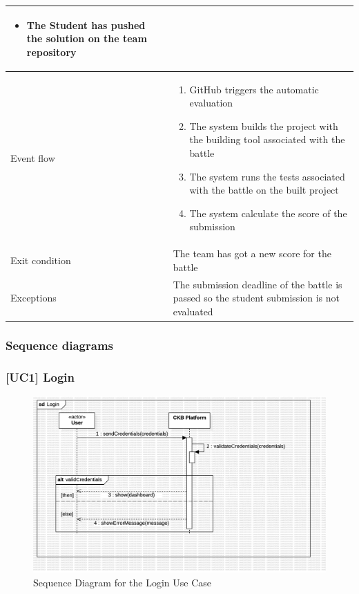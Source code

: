 \begin{enumerate}[label=UC\arabic*:]
\begin{tabular}{|p{3cm}|p{8cm}|}
\begin{itemize}
            \item The Student has pushed the solution on the team repository
        \end{itemize} \\
        \hline
        Event flow &
        \begin{enumerate}[label=\arabic*.]
            \item GitHub triggers the automatic evaluation
            \item The system builds the project with the building tool associated with the battle
            \item The system runs the tests associated with the battle on the built project
            \item The system calculate the score of the submission
        \end{enumerate} \\
        \hline
        Exit condition & The team has got a new score for the battle \\
        \hline
        Exceptions & The submission deadline of the battle is passed so the student submission is not evaluated \\
        \hline
    \end{tabular}
\end{enumerate}

\subsubsection{Sequence diagrams}
\subsubsection*{[UC1] Login}
\begin{figure}[H]
    \centering
    \includegraphics[width=\textwidth]{Diagrams/UC1SequenceDiagram.jpg}
    \caption{Sequence Diagram for the Login Use Case}
    \label{fig:sequence-diagram-login}
\end{figure}

